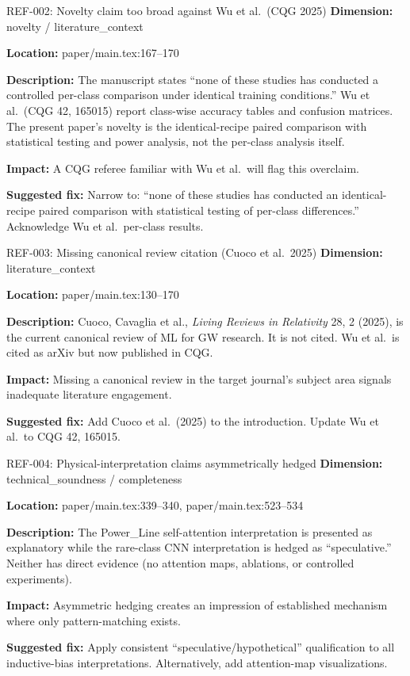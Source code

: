 \documentclass[11pt]{article}
\begin{document}
\begin{MajorIssueBox}{REF-002: Novelty claim too broad against Wu et al.\ (CQG 2025)}
\textbf{Dimension:} novelty / literature\_context

\textbf{Location:} paper/main.tex:167--170

\textbf{Description:} The manuscript states ``none of these studies has conducted a controlled per-class comparison under identical training conditions.'' Wu et al.\ (CQG 42, 165015) report class-wise accuracy tables and confusion matrices. The present paper's novelty is the identical-recipe paired comparison with statistical testing and power analysis, not the per-class analysis itself.

\textbf{Impact:} A CQG referee familiar with Wu et al.\ will flag this overclaim.

\textbf{Suggested fix:} Narrow to: ``none of these studies has conducted an identical-recipe paired comparison with statistical testing of per-class differences.'' Acknowledge Wu et al.\ per-class results.
\end{MajorIssueBox}

\begin{MajorIssueBox}{REF-003: Missing canonical review citation (Cuoco et al.\ 2025)}
\textbf{Dimension:} literature\_context

\textbf{Location:} paper/main.tex:130--170

\textbf{Description:} Cuoco, Cavaglia et al., \emph{Living Reviews in Relativity} 28, 2 (2025), is the current canonical review of ML for GW research. It is not cited. Wu et al.\ is cited as arXiv but now published in CQG.

\textbf{Impact:} Missing a canonical review in the target journal's subject area signals inadequate literature engagement.

\textbf{Suggested fix:} Add Cuoco et al.\ (2025) to the introduction. Update Wu et al.\ to CQG 42, 165015.
\end{MajorIssueBox}

\begin{MajorIssueBox}{REF-004: Physical-interpretation claims asymmetrically hedged}
\textbf{Dimension:} technical\_soundness / completeness

\textbf{Location:} paper/main.tex:339--340, paper/main.tex:523--534

\textbf{Description:} The Power\_Line self-attention interpretation is presented as explanatory while the rare-class CNN interpretation is hedged as ``speculative.'' Neither has direct evidence (no attention maps, ablations, or controlled experiments).

\textbf{Impact:} Asymmetric hedging creates an impression of established mechanism where only pattern-matching exists.

\textbf{Suggested fix:} Apply consistent ``speculative/hypothetical'' qualification to all inductive-bias interpretations. Alternatively, add attention-map visualizations.
\end{MajorIssueBox}
\end{document}
